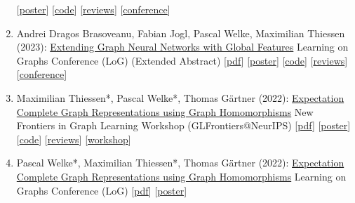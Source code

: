 \documentclass{scrartcl}
\begin{document}
\begin{enumerate}
{[\href{https://pwelke.github.io/publications/bause2023outerplanar-poster.pdf}{poster}]
[\href{https://github.com/ocatias/OuterplanarGNNs_LoG}{code}]
[\href{https://openreview.net/forum?id=7vyGCFTajk}{reviews}]
[\href{https://logconference.org}{conference}]
}
\item
\label{brasoveanu2023gnnglobalfeatures}
Andrei Dragos Brasoveanu, Fabian Jogl, Pascal Welke, Maximilian Thiessen (2023):\newline
\href{https://openreview.net/forum?id=aisVQy6R2k}{Extending Graph Neural Networks with Global Features}\newline
Learning on Graphs Conference (LoG)\newline
(Extended Abstract)\newline
{\footnotesize
[\href{https://pwelke.github.io/publications/brasoveanu2023global.pdf}{pdf}]
[\href{https://pwelke.github.io/publications/brasoveanu2023global-poster.pdf}{poster}]
[\href{https://github.com/andreibrasoveanu97/gnn-global-features}{code}]
[\href{https://openreview.net/forum?id=aisVQy6R2k}{reviews}]
[\href{https://logconference.org}{conference}]
}
\item
\label{thiessen2022expectation}
Maximilian Thiessen*, Pascal Welke*, Thomas Gärtner (2022):\newline
\href{https://pwelke.github.io/publications/thiessen2022glfrontiers.pdf}{Expectation Complete Graph Representations using Graph Homomorphisms}\newline
New Frontiers in Graph Learning Workshop (GLFrontiers@NeurIPS)\newline
{\footnotesize
[\href{https://pwelke.github.io/publications/thiessen2022glfrontiers.pdf}{pdf}]
[\href{https://pwelke.github.io/publications/expectation_complete_poster_neurips.pdf}{poster}]
[\href{https://github.com/pwelke/homcount}{code}]
[\href{https://openreview.net/forum?id=Zf-Mn6xzD2B}{reviews}]
[\href{https://glfrontiers.github.io/}{workshop}]
}
\item
\label{welke2022expectation}
Pascal Welke*, Maximilian Thiessen*, Thomas Gärtner (2022):\newline
\href{https://pwelke.github.io/publications/welke2022log.pdf}{Expectation Complete Graph Representations using Graph Homomorphisms}\newline
Learning on Graphs Conference (LoG)\newline
{\footnotesize
[\href{https://pwelke.github.io/publications/welke2022log.pdf}{pdf}]
[\href{https://pwelke.github.io/publications/expectation_complete_poster_neurips.pdf}{poster}]
}
\end{enumerate}
\end{document}

